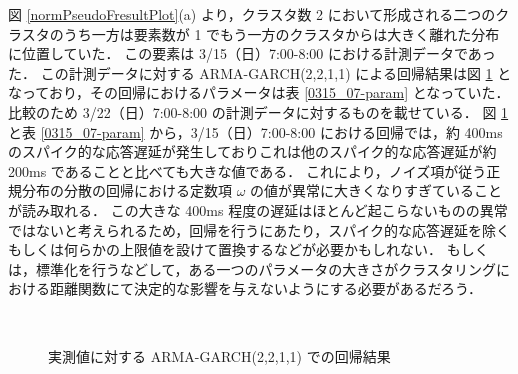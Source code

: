 \documentclass[a4j]{jarticle}
\begin{document}
図 \ref{normPseudoFresultPlot}(a) より，クラスタ数 2 において形成される二つのクラスタのうち一方は要素数が 1 でもう一方のクラスタからは大きく離れた分布に位置していた．
この要素は 3/15（日）7:00-8:00 における計測データであった．
この計測データに対する ARMA-GARCH(2,2,1,1) による回帰結果は図 \ref{0315_07-reg} となっており，その回帰におけるパラメータは表 \ref{0315_07-param} となっていた．
比較のため 3/22（日）7:00-8:00 の計測データに対するものを載せている．
図 \ref{0315_07-reg} と表 \ref{0315_07-param} から，3/15（日）7:00-8:00 における回帰では，約 400ms のスパイク的な応答遅延が発生しておりこれは他のスパイク的な応答遅延が約 200ms であることと比べても大きな値である．
これにより，ノイズ項が従う正規分布の分散の回帰における定数項 $\omega$ の値が異常に大きくなりすぎていることが読み取れる．
この大きな 400ms 程度の遅延はほとんど起こらないものの異常ではないと考えられるため，回帰を行うにあたり，スパイク的な応答遅延を除くもしくは何らかの上限値を設けて置換するなどが必要かもしれない．
もしくは，標準化を行うなどして，ある一つのパラメータの大きさがクラスタリングにおける距離関数にて決定的な影響を与えないようにする必要があるだろう．

\begin{figure}[tb]
\begin{center}
~
\caption{実測値に対する ARMA-GARCH(2,2,1,1) での回帰結果}
\label{0315_07-reg}
\end{center}
\end{figure}
\end{document}
